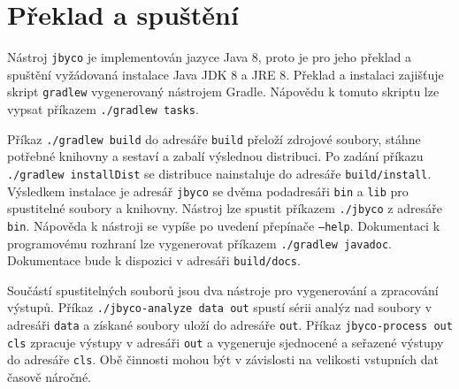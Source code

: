 \section{Překlad a spuštění}\label{ToolRun}

Nástroj \texttt{jbyco} je implementován jazyce Java 8, proto je pro jeho překlad a spuštění vyžádovaná instalace Java JDK 8 a JRE 8.
Překlad a instalaci zajišťuje skript \texttt{gradlew} vygenerovaný nástrojem Gradle. Nápovědu k tomuto skriptu lze vypsat příkazem \texttt{./gradlew tasks}. 

Příkaz \texttt{./gradlew build} do adresáře \texttt{build} přeloží zdrojové soubory, stáhne potřebné knihovny a sestaví a zabalí výslednou distribuci. Po zadání příkazu \texttt{./gradlew installDist} se distribuce nainstaluje do adresáře \texttt{build/install}. Výsledkem instalace je adresář \texttt{jbyco} se dvěma podadresáři \texttt{bin} a \texttt{lib} pro spustitelné soubory a knihovny. Nástroj lze spustit příkazem \texttt{./jbyco} z adresáře \texttt{bin}. Nápověda k nástroji se vypíše po uvedení přepínače \texttt{---help}. Dokumentaci k programovému rozhraní lze vygenerovat příkazem \texttt{./gradlew javadoc}. Dokumentace bude k dispozici v adresáři \texttt{build/docs}.

Součástí spustitelných souborů jsou dva nástroje pro vygenerování a zpracování výstupů. Příkaz \texttt{./jbyco-analyze data out} spustí sérii analýz nad soubory v adresáři \texttt{data} a získané soubory uloží do adresáře \texttt{out}. Příkaz \texttt{jbyco-process out cls} zpracuje výstupy v adresáři \texttt{out} a vygeneruje sjednocené a seřazené výstupy do adresáře \texttt{cls}. Obě činnosti mohou být v závislosti na velikosti vstupních dat časově náročné.







